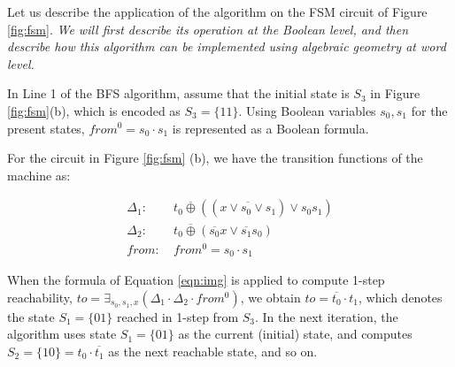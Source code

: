 Let us describe the application of the algorithm on the  FSM circuit
of Figure \ref{fig:fsm}. {\it We will first describe its operation at the
Boolean level, and then describe how this algorithm can be implemented
using algebraic geometry at word level.} 

\begin{figure}[H]
\end{figure}

In Line 1 of the BFS algorithm, assume that the initial state
is $S_3$ in Figure \ref{fig:fsm}(b), which is encoded as 
$S_3 = \{11\}$. Using Boolean variables $s_0, s_1$ for the present
states, $from^0 = s_0\cdot s_1$ is represented as a Boolean formula. 



\begin{Example}
For the circuit in Figure \ref{fig:fsm} (b), we have the transition
functions of the machine as:

\begin{align*}
\Delta_1: & ~t_0 \overline{\oplus} ((\overline{x \vee s_0 \vee s_1}) \vee s_0 s_1)\\
\Delta_2: & ~t_0 \overline{\oplus} (\overline{s_0}x \vee \overline{s_1}s_0)\\
from:     & ~from^0 = s_0\cdot s_1
\end{align*}

When the formula of Equation \ref{eqn:img} is applied to compute 1-step
reachability, $to = \exists _{s_0, s_1, x} (\Delta_1 \cdot \Delta_2
\cdot from^0)$, we obtain $to = \overline{t_0}\cdot t_1$, which denotes
the state $S_1 = \{01\}$ reached in 1-step from $S_3$.
In the next iteration, the algorithm uses state $S_1 = \{01\}$ as the
current (initial) state, and computes $S_2 = \{10\} = t_0\cdot
\overline{t_1}$ as the next reachable state, and so on. 
\end{Example}

